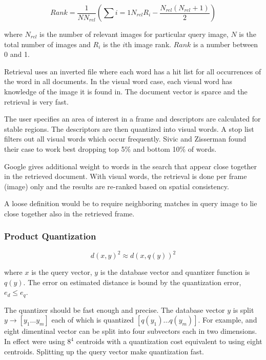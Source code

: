 \documentclass[english,12pt,a4paper,pdftex,elec,utf8]{aaltothesis}
\begin{document}
\begin{equation}\label{bowrank}
  Rank = \frac{1}{NN_{rel}}\left(\sum{i=1}{N_{rel}}R_{i}-\frac{N_{rel}(N_{rel} + 1)}{2}\right)
\end{equation}

where $N_{rel}$ is the number of relevant images for particular query image, $N$ is the total number of images and $R_{i}$ is the $i$th image rank. $Rank$ is a number between 0 and 1.

Retrieval uses an inverted file where each word has a hit list for all occurrences of the word in all documents. In the visual word case, each visual word has knowledge of the image it is found in. The document vector is sparce and the retrieval is very fast.

The user specifies an area of interest in a frame and descriptors are calculated for stable regions. The descriptors are then quantized into visual words. A stop list filters out all visual words which occur frequently. Sivic and Zisserman found their case to work best dropping top 5\% and bottom 10\% of words.

Google gives additional weight to words in the search that appear close together in the retrieved document. With visual words, the retrieval is done per frame (image) only and the results are re-ranked based on spatial consistency.

A loose definition would be to require neighboring matches in query image to lie close together also in the retrieved frame.

\subsubsection{Product Quantization} \label{PQ}

\begin{equation}
  \label{quantizereq}
d(x,y)^2 \approx d(x,q(y))^2
\end{equation}

where $x$ is the query vector, $y$ is the database vector and quantizer function is $q(y)$. The error on estimated distance is bound by the quantization error, $e_d \leq e_q$.  \cite{Jegou2014}

The quantizer should be fast enough and precise. The database vector $y$ is split $y \rightarrow [y_1 \ldots y_m]$ each of which is quantized $[q(y_1)\ldots q(y_m)]$. For example, and eight dimentinal vector can be split into four subvectors each in two dimensions. In effect were using $8^4$ centroids with a quantization cost equivalent to using eight centroids. Splitting up the query vector make quantization fast. \cite{Jegou2014}
\end{document}
